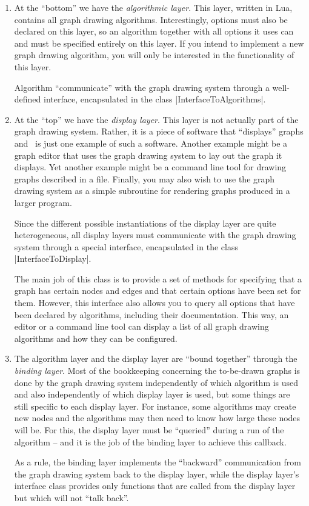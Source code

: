 \begin{enumerate}
\item At the ``bottom'' we have the \emph{algorithmic layer}. This
  layer, written in Lua, contains all graph drawing
  algorithms. Interestingly, options must also be declared on this
  layer, so an algorithm together with all options it uses can and
  must be specified entirely on this layer.
  If you intend to implement a new graph drawing algorithm, you will
  only be interested in the functionality of this layer.

  Algorithm ``communicate'' with the graph drawing system through
  a well-defined interface, encapsulated in the class
  |InterfaceToAlgorithms|.
\item At the ``top'' we have the \emph{display layer}. This layer is
  not actually part of the graph drawing system. Rather, it is a piece
  of software that ``displays'' graphs and \tikzname\ is just one
  example of such a software. Another example might be a graph
  editor that uses the graph drawing system to lay out the graph it
  displays. Yet another example might be a command line tool for
  drawing graphs described in a file. Finally, you may also wish to
  use the graph drawing system as a simple subroutine for rendering
  graphs produced in a larger program.

  Since the different possible instantiations of the display layer are
  quite heterogeneous, all display layers must communicate with the
  graph drawing system through a special interface, encapsulated in
  the class |InterfaceToDisplay|.

  The main job of this class is to provide a set of methods for
  specifying that a graph has certain nodes and edges and that certain
  options have been set for them. However, this interface also allows
  you to query all options that have been declared by algorithms,
  including their documentation. This
  way, an editor or a command line tool can display a list of all
  graph drawing algorithms and how they can be configured.
\item
  The algorithm layer and the display layer are ``bound together''
  through the \emph{binding layer}. Most of the bookkeeping concerning
  the to-be-drawn graphs is done by the graph drawing system
  independently of which algorithm is used and also independently of
  which display layer is used, but some things are still specific to
  each display layer. For instance, some algorithms may create new
  nodes and the algorithms may then need to know how large these nodes
  will be. For this, the display layer must be ``queried'' during a
  run of the algorithm -- and it is the job of the binding layer to
  achieve this callback.
  
  As a rule, the binding layer implements the ``backward''
  communication from the graph drawing system back to the display
  layer, while the display layer's interface class provides only
  functions that are called from the display layer but which will not
  ``talk back''.
\end{enumerate}

